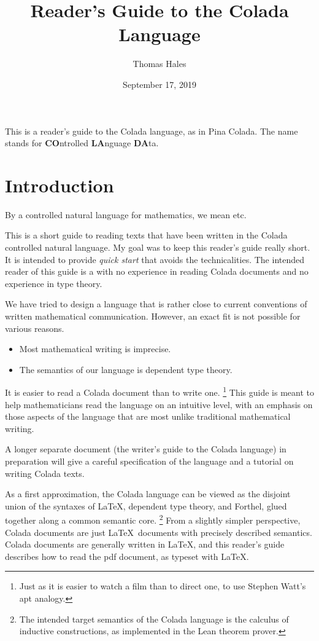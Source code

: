 \documentclass[12pt]{article}
\title{Reader's Guide to the Colada Language}
\date{September 17, 2019}
\author{Thomas Hales}
\numberwithin{definition}{section}
\begin{document}
\maketitle

\setcounter{tocdepth}{1}
\tableofcontents
\newpage

\newcommand{\Nat}{{\mathbb N}}
\newcommand{\Int}{{\mathbb Z}}
\newcommand{\Real}{{\mathbb R}}

This is a reader's guide to the Colada language, as in Pina Colada.  The name
stands for {\bf CO}ntrolled {\bf LA}nguage {\bf DA}ta.

\section{Introduction}
By a controlled natural language for mathematics, we mean etc.

This is a short guide to reading texts that have been written in the
Colada controlled natural language.  My goal was to keep this reader's
guide really short.  It is intended to provide \emph{quick start} that
avoids the technicalities.  The intended reader of this guide is a
with no experience in reading Colada documents and no experience in type theory.

We have tried to design a language that is rather close to current
conventions of written mathematical communication.  However, an exact
fit is not possible for various reasons.

\begin{itemize}
\item Most mathematical writing is imprecise.
\item The semantics of our language is dependent type theory.
\end{itemize}

It is easier to read a Colada document than to write one.%
\footnote{Just as it is easier to watch a film than to direct one, to
  use Stephen Watt's apt analogy.}  
%
This guide is meant to help mathematicians read the language on an
intuitive level, with an emphasis on those aspects of the language
that are most unlike traditional mathematical writing.

A longer separate document (the writer's guide to the Colada language)
in preparation will give a careful specification of the language and a
tutorial on writing Colada texts.

As a first approximation, the Colada language can be viewed as the
disjoint union of the syntaxes of \LaTeX, dependent type theory, and
Forthel, glued together along a common semantic core.%
%
\footnote{The intended target semantics of the Colada language is the
  calculus of inductive constructions, as implemented in the Lean
  theorem prover.}
%
From a slightly simpler perspective, Colada documents are just
\LaTeX\ documents with precisely described semantics.  Colada documents are
generally written in \LaTeX, and this reader's guide describes how to
read the pdf document, as typeset with \LaTeX.
\end{document}
